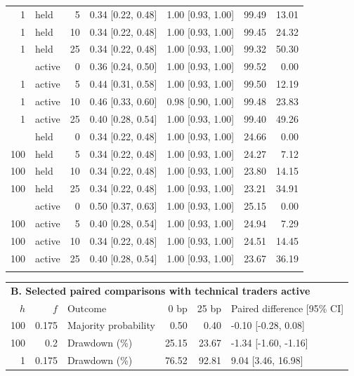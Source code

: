 \begin{center}
\begin{minipage}{\linewidth}
\begin{tabular}{r l r c c r r}
1 & held & 5 & 0.34 [0.22, 0.48] & 1.00 [0.93, 1.00] & 99.49 & 13.01 \\
1 & held & 10 & 0.34 [0.22, 0.48] & 1.00 [0.93, 1.00] & 99.45 & 24.32 \\
1 & held & 25 & 0.34 [0.22, 0.48] & 1.00 [0.93, 1.00] & 99.32 & 50.30 \\
\addlinespace
1 & active & 0 & 0.36 [0.24, 0.50] & 1.00 [0.93, 1.00] & 99.52 & 0.00 \\
1 & active & 5 & 0.44 [0.31, 0.58] & 1.00 [0.93, 1.00] & 99.50 & 12.19 \\
1 & active & 10 & 0.46 [0.33, 0.60] & 0.98 [0.90, 1.00] & 99.48 & 23.83 \\
1 & active & 25 & 0.40 [0.28, 0.54] & 1.00 [0.93, 1.00] & 99.40 & 49.26 \\
\addlinespace
100 & held & 0 & 0.34 [0.22, 0.48] & 1.00 [0.93, 1.00] & 24.66 & 0.00 \\
100 & held & 5 & 0.34 [0.22, 0.48] & 1.00 [0.93, 1.00] & 24.27 & 7.12 \\
100 & held & 10 & 0.34 [0.22, 0.48] & 1.00 [0.93, 1.00] & 23.80 & 14.15 \\
100 & held & 25 & 0.34 [0.22, 0.48] & 1.00 [0.93, 1.00] & 23.21 & 34.91 \\
\addlinespace
100 & active & 0 & 0.50 [0.37, 0.63] & 1.00 [0.93, 1.00] & 25.15 & 0.00 \\
100 & active & 5 & 0.40 [0.28, 0.54] & 1.00 [0.93, 1.00] & 24.94 & 7.29 \\
100 & active & 10 & 0.34 [0.22, 0.48] & 1.00 [0.93, 1.00] & 24.51 & 14.45 \\
100 & active & 25 & 0.40 [0.28, 0.54] & 1.00 [0.93, 1.00] & 23.67 & 36.19 \\
\addlinespace
\bottomrule
\end{tabular}

\medskip
\begin{tabular}{rrlrrl}
\toprule
\multicolumn{6}{l}{\textbf{B. Selected paired comparisons with technical traders active}}\\
$h$ & $f$ & Outcome & 0 bp & 25 bp & Paired difference [95\% CI]\\
\midrule
100 & 0.175 & Majority probability & 0.50 & 0.40 & -0.10 [-0.28, 0.08] \\
100 & 0.2 & Drawdown (\%) & 25.15 & 23.67 & -1.34 [-1.60, -1.16] \\
1 & 0.175 & Drawdown (\%) & 76.52 & 92.81 & 9.04 [3.46, 16.98] \\
\bottomrule
\end{tabular}
\end{minipage}
\end{center}
